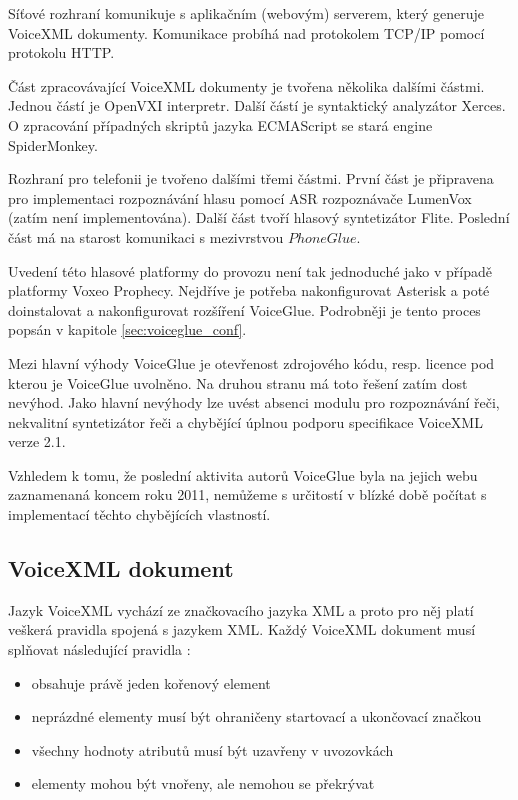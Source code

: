 \documentclass[ing,male,java,dept460]{diploma}						%
\begin{document}
Síťové rozhraní komunikuje s aplikačním (webovým) serverem, který generuje VoiceXML dokumenty. Komunikace probíhá nad protokolem TCP/IP pomocí protokolu HTTP.

Část zpracovávající VoiceXML dokumenty je tvořena několika dalšími částmi. Jednou částí je OpenVXI interpretr. Další částí je syntaktický analyzátor Xerces. O zpracování případných skriptů jazyka ECMAScript se stará engine SpiderMonkey.

Rozhraní pro telefonii je tvořeno dalšími třemi částmi. První část je připravena pro implementaci rozpoznávání hlasu pomocí ASR rozpoznávače LumenVox (zatím není implementována). Další část tvoří hlasový syntetizátor Flite. Poslední část má na starost komunikaci s mezivrstvou $PhoneGlue$. \cite{vxml_interpreters}

Uvedení této hlasové platformy do provozu není tak jednoduché jako v případě platformy Voxeo Prophecy. Nejdříve je potřeba nakonfigurovat Asterisk a poté doinstalovat a nakonfigurovat rozšíření VoiceGlue. Podrobněji je tento proces popsán v kapitole \ref{sec:voiceglue_conf}.

Mezi hlavní výhody VoiceGlue je otevřenost zdrojového kódu, resp. licence pod kterou je VoiceGlue uvolněno. Na druhou stranu má toto řešení zatím dost nevýhod. Jako hlavní nevýhody lze uvést absenci modulu pro rozpoznávání řeči, nekvalitní syntetizátor řeči a chybějící úplnou podporu specifikace VoiceXML verze 2.1.

Vzhledem k tomu, že poslední aktivita autorů VoiceGlue byla na jejich webu zaznamenaná koncem roku 2011, nemůžeme s určitostí v blízké době počítat s implementací těchto chybějících vlastností.

\subsection{VoiceXML dokument}
\label{sec:Zaklady_vxml}
Jazyk VoiceXML vychází ze značkovacího jazyka XML a proto pro něj platí veškerá pravidla spojená s jazykem XML. Každý VoiceXML dokument musí splňovat následující pravidla \cite{xml_wiki}:

\begin{itemize}
\item obsahuje právě jeden kořenový element
\item neprázdné elementy musí být ohraničeny startovací a ukončovací značkou
\item všechny hodnoty atributů musí být uzavřeny v uvozovkách
\item elementy mohou být vnořeny, ale nemohou se překrývat
\end{itemize}
\end{document}
